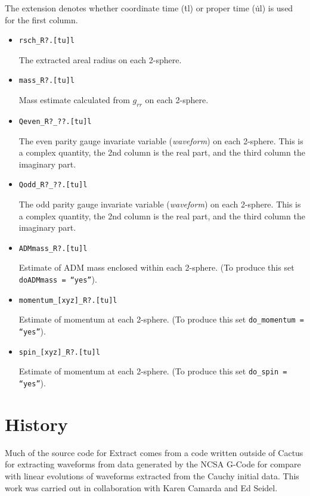 \documentclass{article}
\begin{document}
The extension denotes whether coordinate time ({\.tl}) or proper time
({\.ul}) is used for the first column.

\begin{itemize}

  \item {\tt rsch\_R?.[tu]l} 

	The extracted areal radius on each 2-sphere.

  \item {\tt mass\_R?.[tu]l}

	Mass estimate calculated from $g_{rr}$ on each 2-sphere.

  \item {\tt Qeven\_R?\_??.[tu]l}

	The even parity gauge invariate variable ({\it waveform}) on 
	each 2-sphere. This is a complex quantity, the 2nd column is 
	the real part, and the third column the imaginary part.

  \item {\tt Qodd\_R?\_??.[tu]l}

	The odd parity gauge invariate variable ({\it waveform}) on 
	each 2-sphere. This is a complex quantity, the 2nd column is 
	the real part, and the third column the imaginary part.

  \item {\tt ADMmass\_R?.[tu]l}

	Estimate of ADM mass enclosed within each 2-sphere.
	(To produce this set {\tt doADMmass = ``yes''}).

  \item {\tt momentum\_[xyz]\_R?.[tu]l}

	Estimate of momentum at each 2-sphere.
	(To produce this set {\tt do\_momentum = ``yes''}).

  \item {\tt spin\_[xyz]\_R?.[tu]l}

	Estimate of momentum at each 2-sphere.
	(To produce this set {\tt do\_spin = ``yes''}).


\end{itemize}

\section{History}

Much of the source code
 for Extract comes from a code written outside
of Cactus for extracting waveforms from data generated by the NCSA
G-Code for compare with linear evolutions of waveforms extracted from
the Cauchy initial data.  This work was carried out in collaboration
with Karen Camarda and Ed Seidel.
\end{document}
